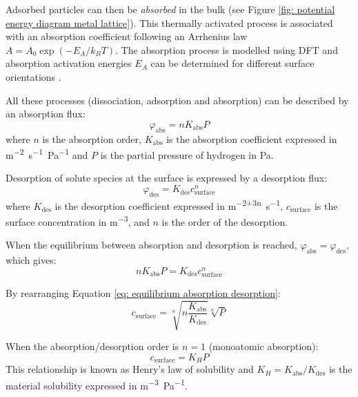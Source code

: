 Adsorbed particles can then be \textit{absorbed} in the bulk (see Figure \ref{fig: potential energy diagram metal lattice}).
This thermally activated process is associated with an absorption coefficient following an Arrhenius law $A=A_0 \exp{(-E_A/k_B T)}$.
The absorption process is modelled using DFT and absorption activation energies $E_A$ can be determined for different surface orientations .

All these processes (dissociation, adsorption and absorption) can be described by an absorption flux:
\begin{equation}
    \varphi_\mathrm{abs} = n K_\mathrm{abs} P
\end{equation}
where $n$ is the absorption order, $K_\mathrm{abs}$ is the absorption coefficient expressed in \si{m^{-2}.s^{-1}.Pa^{-1}} and $P$ is the partial pressure of hydrogen in \si{Pa}.

Desorption of solute species at the surface is expressed by a desorption flux:
\begin{equation}
    \varphi_\mathrm{des} = K_\mathrm{des} c_\mathrm{surface}^n
\end{equation}
where $K_\mathrm{des}$ is the desorption coefficient expressed in \si{m^{-2+3n}.s^{-1}}, $c_\mathrm{surface}$ is the surface concentration in \si{m^{-3}}, and $n$ is the order of the desorption.

When the equilibrium between absorption and desorption is reached, $\varphi_\mathrm{abs} = \varphi_\mathrm{des}$, which gives:
\begin{equation}
    n K_\mathrm{abs} P = K_\mathrm{des} c_\mathrm{surface}^n
    \label{eq: equilibrium absorption desorption}
\end{equation}

By rearranging Equation \ref{eq: equilibrium absorption desorption}:
\begin{equation}
    c_\mathrm{surface} = \sqrt[n]{n \frac{K_\mathrm{abs}}{K_\mathrm{des}}} \sqrt[n]{P}
\end{equation}

When the absorption/desorption order is $n=1$ (monoatomic absorption):
\begin{equation}
    c_\mathrm{surface} = K_H P
\end{equation}
This relationship is known as Henry's law of solubility and $K_H = K_\mathrm{abs}/K_\mathrm{des}$ is the material solubility expressed in \si{m^{-3}.Pa^{-1}}.

